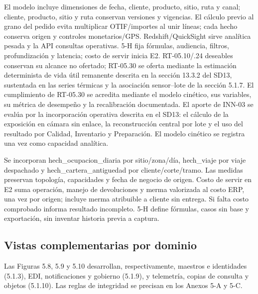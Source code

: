 El modelo incluye dimensiones de fecha, cliente, producto, sitio, ruta y canal; cliente, producto, sitio y ruta conservan versiones y vigencias. El cálculo previo al grano del pedido evita multiplicar OTIF/importes al unir líneas; cada hecho conserva origen y controles monetarios/GPS. Redshift/QuickSight sirve analítica pesada y la API consultas operativas. 5-H fija fórmulas, audiencia, filtros, profundización y latencia; costo de servir inicia E2. RT-05.10/.24 deseables conservan su alcance no ofertado; RT-05.30 se oferta mediante la estimación determinista de vida útil remanente descrita en la sección 13.3.2 del SD13, sustentada en las series térmicas y la asociación sensor–lote de la sección 5.1.7. El cumplimiento de RT-05.30 se acredita mediante el modelo cinético, sus variables, su métrica de desempeño y la recalibración documentada. El aporte de INN-03 se evalúa por la incorporación operativa descrita en el SD13: el cálculo de la exposición en cámara sin enlace, la reconstrucción central por lote y el uso del resultado por Calidad, Inventario y Preparación. El modelo cinético se registra una vez como capacidad analítica.

Se incorporan hech\_ocupacion\_diaria por sitio/zona/día, hech\_viaje por viaje despachado y hech\_cartera\_antiguedad por cliente/corte/tramo. Las medidas preservan topología, capacidades y fecha de negocio de origen. Costo de servir en E2 suma operación, manejo de devoluciones y merma valorizada al costo ERP, una vez por origen; incluye merma atribuible a cliente sin entrega. Si falta costo comprobado informa resultado incompleto. 5-H define fórmulas, casos sin base y exportación, sin inventar historia previa a captura.

\subsection*{Vistas complementarias por dominio}

Las Figuras 5.8, 5.9 y 5.10 desarrollan, respectivamente, maestros e identidades (5.1.3), EDI, notificaciones y gobierno (5.1.9), y telemetría, copias de consulta y objetos (5.1.10). Las reglas de integridad se precisan en los Anexos 5-A y 5-C.

